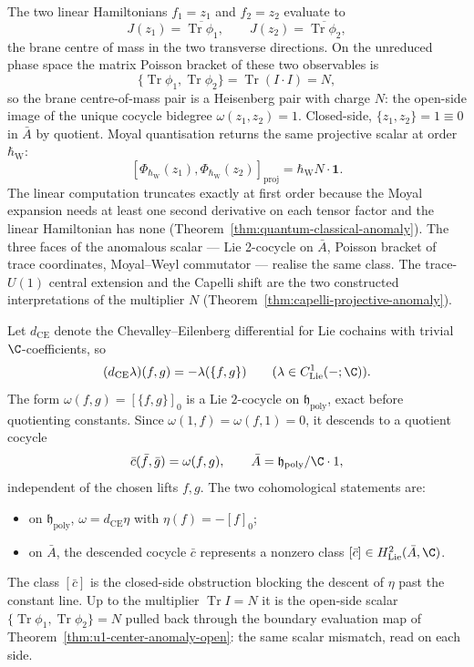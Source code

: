 \documentclass[11pt]{memoir}
\begin{document}
\begin{ex}\label{ex:linear-hamiltonian-com}
  The two linear Hamiltonians \(f_1=z_1\) and \(f_2=z_2\) evaluate to
  \[
    J(z_1)=\overline{\operatorname{Tr}\phi_1},
    \qquad
    J(z_2)=\overline{\operatorname{Tr}\phi_2},
  \]
  the brane centre of mass in the two transverse directions.  On the
  unreduced phase space the matrix Poisson bracket of these two
  observables is
  \[
    \{\operatorname{Tr}\phi_1,\operatorname{Tr}\phi_2\}
      =\operatorname{Tr}(I\cdot I)=N,
  \]
  so the brane centre-of-mass pair is a Heisenberg pair with charge
  \(N\): the open-side image of the unique cocycle bidegree
  \(\omega(z_1,z_2)=1\).  Closed-side, \(\{z_1,z_2\}=1\equiv0\) in
  \(\bar A\) by quotient.  Moyal quantisation returns the same
  projective scalar at order \(\hbar_{\mathrm{W}}\):
  \[
    [\Phi_{\hbar_{\mathrm{W}}}(z_1),
     \Phi_{\hbar_{\mathrm{W}}}(z_2)]_{\mathrm{proj}}
      =\hbar_{\mathrm{W}}N\cdot\mathbf 1 .
  \]
  The linear computation truncates exactly at first order because the Moyal expansion needs
  at least one second derivative on each tensor factor and the linear
  Hamiltonian has none (Theorem~\ref{thm:quantum-classical-anomaly}).
  The three faces of the anomalous scalar --- Lie 2-cocycle on
  $\bar A$, Poisson bracket of trace coordinates, Moyal--Weyl
  commutator --- realise the same class.  The trace-\(U(1)\) central
  extension and the Capelli shift are the two constructed
  interpretations of the multiplier \(N\)
  (Theorem~\ref{thm:capelli-projective-anomaly}).
\end{ex}

\begin{lem}\label{lem:omega-cocycle}
  Let \(d_{\mathrm{CE}}\) denote the Chevalley--Eilenberg differential
  for Lie cochains with trivial \(\C\)-coefficients, so
  \[
    (d_{\mathrm{CE}}\lambda)(f,g)=-\lambda(\{f,g\})
    \qquad(\lambda\in C^1_{\mathrm{Lie}}(-;\C)).
  \]
  The form \(\omega(f,g)=[\{f,g\}]_0\) is a Lie \(2\)-cocycle on
  \(\mathfrak h_{\mathrm{poly}}\), exact before quotienting constants.
  Since \(\omega(1,f)=\omega(f,1)=0\), it descends to a quotient cocycle
  \[
    \bar c(\bar f,\bar g)=\omega(f,g),
    \qquad
    \bar A=\mathfrak h_{\mathrm{poly}}/\C\cdot1,
  \]
  independent of the chosen lifts \(f,g\).  The two cohomological
  statements are:
  \begin{itemize}
    \item on \(\mathfrak h_{\mathrm{poly}}\), \(\omega=d_{\mathrm{CE}}\eta\)
      with \(\eta(f)=-[f]_0\);
    \item on \(\bar A\), the descended cocycle \(\bar c\) represents a
      nonzero class
      $[\bar c]\in H^2_{\mathrm{Lie}}(\bar A,\C)$.
  \end{itemize}
  The class $[\bar c]$ is the closed-side obstruction blocking the
  descent of $\eta$ past the constant line.  Up to the multiplier
  $\operatorname{Tr}I=N$ it is the open-side scalar
  $\{\operatorname{Tr}\phi_1,\operatorname{Tr}\phi_2\}=N$ pulled back
  through the boundary evaluation map of
  Theorem~\ref{thm:u1-center-anomaly-open}: the same scalar mismatch,
  read on each side.
\end{lem}
\end{document}
